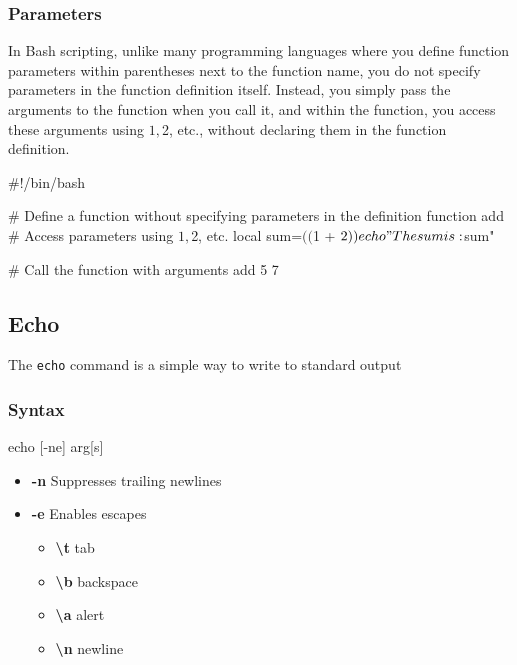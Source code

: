 \documentclass{report}
\begin{document}
    \subsubsection{Parameters}
    \bigbreak \noindent 
    In Bash scripting, unlike many programming languages where you define function parameters within parentheses next to the function name, you do not specify parameters in the function definition itself. Instead, you simply pass the arguments to the function when you call it, and within the function, you access these arguments using $1, $2, etc., without declaring them in the function definition.
    \bigbreak \noindent 
    \begin{bashcode}
#!/bin/bash

# Define a function without specifying parameters in the definition
function add {
    # Access parameters using $1, $2, etc.
    local sum=$(( $1 + $2 ))
    echo "The sum is: $sum"
}

# Call the function with arguments
add 5 7
    \end{bashcode}

    \bigbreak \noindent 
    \subsection{Echo}
    \bigbreak \noindent 
    The \texttt{echo} command is a simple way to write to standard output
    \bigbreak \noindent 
    \subsubsection{Syntax}
    \bigbreak \noindent 
    \begin{bashcode}
        echo [-ne] arg[s]
    \end{bashcode}
    \begin{itemize}
        \item \textbf{-n} Suppresses trailing newlines
        \item \textbf{-e} Enables escapes
            \begin{itemize}
                \item \textbf{\textbackslash t} tab
                \item \textbf{\textbackslash b} backspace
                \item \textbf{\textbackslash a} alert
                \item \textbf{\textbackslash n} newline
            \end{itemize}
    \end{itemize}
    \bigbreak \noindent 
\end{document}
